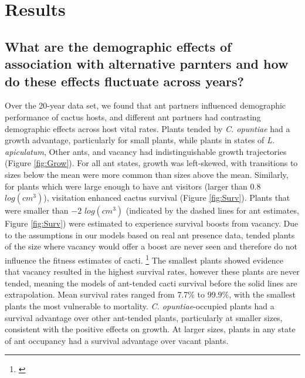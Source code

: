\documentclass[11pt]{article}
\newcommand{\ali}[2]{{\color{blue}{#1}}\footnote{\textit{\color{blue}{#2}}}}
\begin{document}
 
\section*{Results}
\subsection*{What are the demographic effects of association with alternative parnters and how do these effects fluctuate across years?}
Over the 20-year data set, we found that ant partners influenced demographic performance of cactus hosts, and different ant partners had contrasting demographic effects across host vital rates. 
Plants tended by \textit{C. opuntiae} had a growth advantage, particularly for small plants, while plants in states of \textit{L. apiculatum}, Other ants, and vacancy had indistinguishable growth trajectories (Figure \ref{fig:Grow}).
For all ant states, growth was left-skewed, with transitions to sizes below the mean were more common than sizes above the mean. 
Similarly, for plants which were large enough to have ant visitors (larger than $0.8$ $log(cm^3)$), visitation enhanced cactus survival (Figure \ref{fig:Surv}).
Plants that were smaller than $-2$ $log(cm^3)$ (indicated by the dashed lines for ant estimates, Figure \ref{fig:Surv}) were estimated to experience survival boosts from vacancy.
Due to the assumptions in our models based on real ant presence data, tended plants of the size where vacancy would offer a boost are never seen and therefore do not influence the fitness estimates of cacti. \ali{}{I'm not 100\% certain on how to discuss this. I know that this still shows that crem offer a survival advantage, but I see that it could look like vacancy offers survival advantages. }
The smallest plants showed evidence that vacancy resulted in the highest survival rates, however these plants are never tended, meaning the models of ant-tended cacti survival before the solid lines are extrapolation.
Mean survival rates ranged from 7.7\% to 99.9\%, with the smallest plants the most vulnerable to mortality. 
\textit{C. opuntiae}-occupied plants had a survival advantage over other ant-tended plants, particularly at smaller sizes, consistent with the positive effects on growth. 
At larger sizes, plants in any state of ant occupancy had a survival advantage over vacant plants. 
\end{document}
